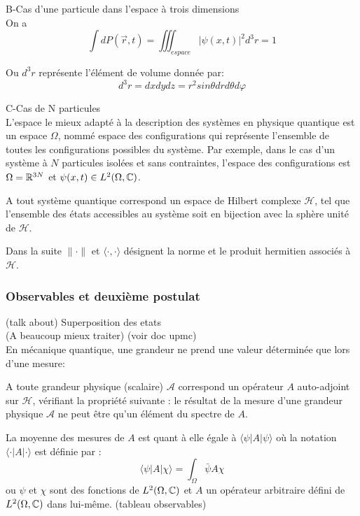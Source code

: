 B-Cas d’une particule dans l’espace à trois dimensions\\
On a 
\begin{equation}
\int dP(\vec{r},t)=\iiint_{espace}|\psi(x,t)|^2d^3r=1
\end{equation}

Ou $d^3r$ représente l'élément de volume donnée par: $$d^3r=dxdydz=r^2sin\theta dr d\theta d\varphi$$

C-Cas de N particules\\
L’espace le mieux adapté à la description des systèmes en physique quantique est un espace $\Omega$, nommé espace des configurations qui représente l’ensemble de toutes les configurations possibles du système. Par exemple, dans le cas d’un système à $N$ particules isolées et sans contraintes, l’espace des configurations est $\Omega = \mathbb R^{3N}$ et $\psi(x,t) \in L^2(\Omega, \mathbb C)$.

\begin{Post}
	A tout système quantique correspond un espace de Hilbert complexe $\mathcal{H}$, tel que l’ensemble des états accessibles au système soit en bijection avec la sphère unité de $\mathcal{H}$.
\end{Post}
Dans la suite $\lVert\cdot\rVert$ et $\langle\cdot,\cdot\rangle$ désignent la norme et le produit hermitien associés à $\mathcal{H}$.
\subsubsection{Observables et deuxième postulat}
(talk about) Superposition des etats\\
(A beaucoup mieux traiter) (voir doc upmc)\\
En mécanique quantique, une grandeur ne prend une valeur déterminée que lors d’une mesure:
\begin{Post}
	A toute grandeur physique (scalaire) $\mathcal{A}$ correspond un opérateur $A$ auto-adjoint sur $\mathcal{H}$, vérifiant la propriété suivante : le résultat de la mesure d’une grandeur physique $\mathcal{A}$ ne peut être qu’un élément du spectre de $A$.
\end{Post}
La moyenne des mesures de $A$ est quant à elle égale à $\langle\psi|A|\psi\rangle$ où la notation $\langle\cdot|A|\cdot\rangle$ est définie par :
\begin{equation}
\langle\psi|A|\chi\rangle = \int_{\Omega} \bar{\psi}A\chi
\end{equation}
ou $\psi$ et $\chi$ sont des fonctions de $L^2(\Omega, \mathbb C)$ et $A$ un opérateur arbitraire défini de $L^2(\Omega, \mathbb C)$ dans lui-même.
(tableau observables)
